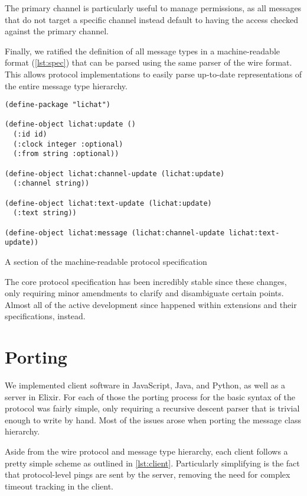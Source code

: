 \documentclass[format=sigconf]{acmart}
\begin{document}
The primary channel is particularly useful to manage permissions, as all messages that do not target a specific channel instead default to having the access checked against the primary channel.

Finally, we ratified the definition of all message types in a machine-readable format (\autoref{lst:spec}) that can be parsed using the same parser of the wire format. This allows protocol implementations to easily parse up-to-date representations of the entire message type hierarchy.

\begin{listing}
\begin{verbatim}
(define-package "lichat")

(define-object lichat:update ()
  (:id id)
  (:clock integer :optional)
  (:from string :optional))

(define-object lichat:channel-update (lichat:update)
  (:channel string))

(define-object lichat:text-update (lichat:update)
  (:text string))

(define-object lichat:message (lichat:channel-update lichat:text-update))
\end{verbatim}
\caption{A section of the machine-readable protocol specification}
\label{lst:spec}
\end{listing}

The core protocol specification has been incredibly stable since these changes, only requiring minor amendments to clarify and disambiguate certain points. Almost all of the active development since happened within extensions and their specifications, instead.

\section{Porting}
We implemented client software in JavaScript, Java, and Python, as well as a server in Elixir. For each of those the porting process for the basic syntax of the protocol was fairly simple, only requiring a recursive descent parser that is trivial enough to write by hand. Most of the issues arose when porting the message class hierarchy.

Aside from the wire protocol and message type hierarchy, each client follows a pretty simple scheme as outlined in \autoref{lst:client}. Particularly simplifying is the fact that protocol-level pings are sent by the server, removing the need for complex timeout tracking in the client.
\end{document}
